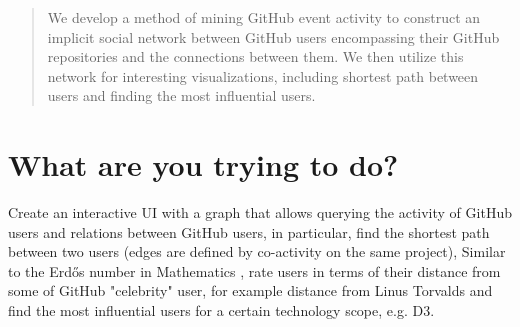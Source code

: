 \documentclass[sigconf,11pt]{acmart}
\begin{document}


\begin{abstract}
  We develop a method of mining GitHub event activity to construct an implicit social network
  between GitHub users encompassing their GitHub repositories and the connections between them.
  We then utilize this network for interesting visualizations, including shortest path between users
  and finding the most influential users.
\end{abstract}




\maketitle
\pagestyle{plain}

\section*{What are you trying to do?}
Create an interactive UI with a graph that allows querying the activity of GitHub users
and relations between GitHub users, in particular, find the shortest path between two users
(edges are defined by co-activity on the same project),
Similar to the Erdős number in Mathematics \cite{wiki:erdos}, rate users in terms of their
distance from some of GitHub "celebrity" user, for example distance from Linus Torvalds
and find the most influential users for a certain technology scope, e.g. D3.
\end{document}
